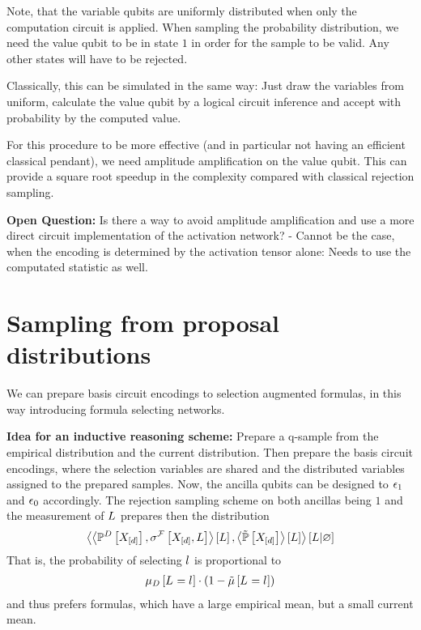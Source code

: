 \documentclass[aps,onecolumn,nofootinbib,pra]{article}
\begin{document}
    Note, that the variable qubits are uniformly distributed when only the computation circuit is applied.
    When sampling the probability distribution, we need the value qubit to be in state $1$ in order for the sample to be valid.
    Any other states will have to be rejected.

    Classically, this can be simulated in the same way: Just draw the variables from uniform, calculate the value qubit by a logical circuit inference and accept with probability by the computed value.

    For this procedure to be more effective (and in particular not having an efficient classical pendant), we need amplitude amplification on the value qubit.
    This can provide a square root speedup in the complexity compared with classical rejection sampling.

    \textbf{Open Question:} Is there a way to avoid amplitude amplification and use a more direct circuit implementation of the activation network?
    - Cannot be the case, when the encoding is determined by the activation tensor alone: Needs to use the computated statistic as well.


    \section{Sampling from proposal distributions}

    We can prepare basis circuit encodings to selection augmented formulas, in this way introducing formula selecting networks.

    \textbf{Idea for an inductive reasoning scheme:} Prepare a q-sample from the empirical distribution and the current distribution.
    Then prepare the basis circuit encodings, where the selection variables are shared and the distributed variables assigned to the prepared samples.
    Now, the ancilla qubits can be designed to $\epsilon_{1}$ and $\epsilon_{0}$ accordingly.
    The rejection sampling scheme on both ancillas being $1$ and the measurement of $L$ prepares then the distribution
    \begin{align*}
        \left\langle 
            \left\langle \mathbb{P}^{D}\left[X_{[d]}\right], \sigma^{\mathcal{F}}\left[X_{[d]},L\right]\right\rangle \left[ L \right], \left\langle \tilde{\mathbb{P}}\left[X_{[d]}\right]\right\rangle \left[ L \right]
        \right\rangle \left[ L | \varnothing \right]
    \end{align*}
    That is, the probability of selecting $l$ is proportional to
    \begin{align*}
        \mu_{D}\left[L_{}=l_{}\right] \cdot (1-\tilde{\mu}\left[L_{}=l_{}\right])
    \end{align*}
    and thus prefers formulas, which have a large empirical mean, but a small current mean.
\end{document}
